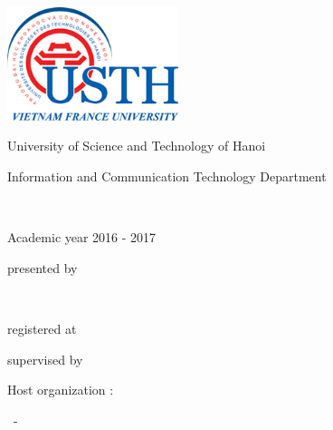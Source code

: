 \empty
\thispagestyle{empty}

\begin{center}

\includegraphics[angle=0,width=5cm]{images/logo-1_39.png}

\vspace*{1cm} 

{\huge University of Science and Technology of Hanoi }\\

\vspace*{1cm} 

{\large Information and Communication Technology Department}\\

\vspace*{1cm} 

{\huge \MasterLevel }\\

\vspace*{1cm} 

{\large Academic year 2016 -  2017}

\vfill

\noindent\hrulefill

\vspace*{2mm} 

{\Large \InternshipTitle }

\noindent\hrulefill

\vfill 

{\large presented by } \\

\vspace*{5mm} 

{\large \bf \FirstName~  \LastName} \\

\vspace*{5mm} 

{\large registered at \UniversityName } \\

\vspace*{5mm} 

{\large supervised by  \Supervisor } \\

\vspace*{20mm} 

{\large Host organization :   \HostOrganization }

\vspace*{5mm} 

{\large  \CityName~- \CountryName} \\

\vspace*{5mm} 

\end{center}
